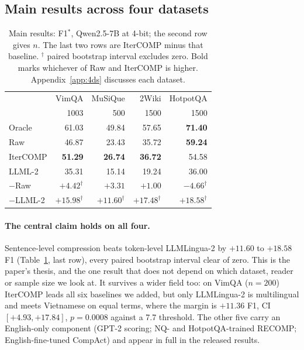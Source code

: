 \documentclass[11pt]{article}
\begin{document}
\subsection{Main results across four datasets}
\label{sec:main}

\begin{table}[tbp]
\centering
\footnotesize
\setlength{\tabcolsep}{2.4pt}
\begin{tabular}{lrrrr}
\toprule
& VimQA & MuSiQue & 2Wiki & HotpotQA \\
& 1003 & 500 & 1500 & 1500 \\
\midrule
Oracle & 61.03 & 49.84 & 57.65 & \textbf{71.40} \\
Raw & 46.87 & 23.43 & 35.72 & \textbf{59.24} \\
IterCOMP & \textbf{51.29} & \textbf{26.74} & \textbf{36.72} & 54.58 \\
LLML-2 & 35.31 & 15.14 & 19.24 & 36.00 \\
\midrule
$-$Raw & $+4.42^\dag$ & $+3.31$ & $+1.00$ & $\mathbf{-4.66^\dag}$ \\
$-$LLML-2 & $+15.98^\dag$ & $+11.60^\dag$ & $+17.48^\dag$ & $+18.58^\dag$ \\
\bottomrule
\end{tabular}
\caption{Main results: F1$^*$, Qwen2.5-7B at 4-bit; the second row gives $n$. The
last two rows are IterCOMP minus that baseline. $^\dag$ paired bootstrap interval
excludes zero. Bold marks whichever of Raw and IterCOMP is higher.
Appendix~\ref{app:4ds} discusses each dataset.}
\label{tab:4ds}
\end{table}

\paragraph{The central claim holds on all four.} Sentence-level compression beats
token-level LLMLingua-2 by $+11.60$ to $+18.58$ F1 (Table~\ref{tab:4ds}, last
row), every paired bootstrap interval clear of zero. This is the paper's thesis,
and the one result that does not depend on which dataset, reader or sample size we
look at. It survives a wider field too: on VimQA ($n=200$) IterCOMP leads all six
baselines we added, but only LLMLingua-2 is multilingual and meets Vietnamese on
equal terms, where the margin is $+11.36$ F1, CI $[+4.93, +17.84]$, $p=0.0008$
against a 7.7 threshold. The other five carry an English-only component (GPT-2
scoring; NQ- and HotpotQA-trained RECOMP; English-fine-tuned CompAct) and appear
in full in the released results.
\end{document}
